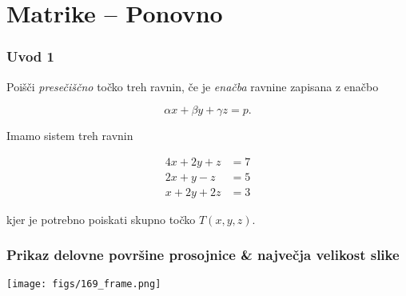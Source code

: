 \documentclass[8pt,aspectratio=169]{beamer} %
\begin{document}
\section{Matrike -- Ponovno}

\begin{frame}[plain,noframenumbering,label=newsection]
	\vfill
	\begin{center}
		
		\vspace*{5mm}
		\textcolor{royalblue1}{\textbf{\insertsectionhead}}
	\end{center}
	\vfill
\end{frame}


\begin{frame}
	\frametitle{Uvod 1}
	
	 Poišči \emph{presečiščno} točko treh ravnin, če je \emph{enačba} ravnine zapisana z enačbo
	
	\[
	\alpha x + \beta y + \gamma z = p.
	\]
	
	 Imamo sistem treh ravnin
	
	\begin{equation} \label{eq:plane_system}
		\begin{split}
			4 x + 2 y + z & = 7\\
			2 x + y - z & = 5\\
			x + 2 y + 2 z & = 3
		\end{split}	
	\end{equation}
	
	kjer je potrebno poiskati skupno točko $T(x,y,z)$.
	
\end{frame}


\begin{frame}
	\frametitle{Prikaz delovne površine prosojnice \& največja velikost slike}
	
	
	\begin{center}
		\texttt{[image: figs/169\_frame.png]} %
	\end{center}	
	
\end{frame}
\end{document}

